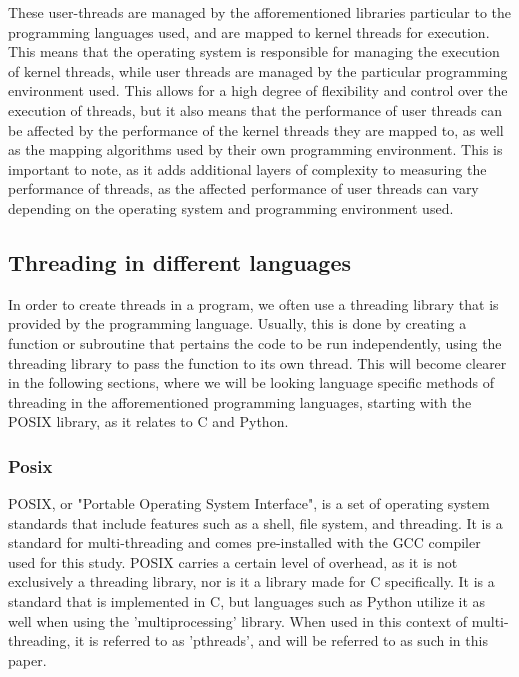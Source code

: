 \documentclass[12pt,a4paper]{article}
\begin{document}
These user-threads are managed by the afforementioned libraries particular to the programming languages used, and are mapped to kernel threads for execution. This means that the operating system is responsible for managing the execution of kernel threads, while user threads are managed by the particular programming environment used. This allows for a high degree of flexibility and control over the execution of threads, but it also means that the performance of user threads can be affected by the performance of the kernel threads they are mapped to, as well as the mapping algorithms used by their own programming environment. This is important to note, as it adds additional layers of complexity to measuring the performance of threads, as the affected performance of user threads can vary depending on the operating system and programming environment used.

\subsection{Threading in different languages}

In order to create threads in a program, we often use a threading library that is provided by the programming language. Usually, this is done by creating a function or subroutine that pertains the code to be run independently, using the threading library to pass the function to its own thread. This will become clearer in the following sections, where we will be looking language specific methods of threading in the afforementioned programming languages, starting with the POSIX library, as it relates to C and Python.

\subsubsection{Posix}

POSIX, or "Portable Operating System Interface"\parencite{Open2025,GNU2025}, is a set of operating system standards that include features such as a shell, file system, and threading. It is a standard for multi-threading and comes pre-installed with the GCC compiler\parencite{GNU2025} used for this study. POSIX carries a certain level of overhead, as it is not exclusively a threading library, nor is it a library made for C specifically. It is a standard that is implemented in C, but languages such as Python utilize it as well when using the 'multiprocessing' library. When used in this context of multi-threading, it is referred to as 'pthreads', and will be referred to as such in this paper.
\end{document}

